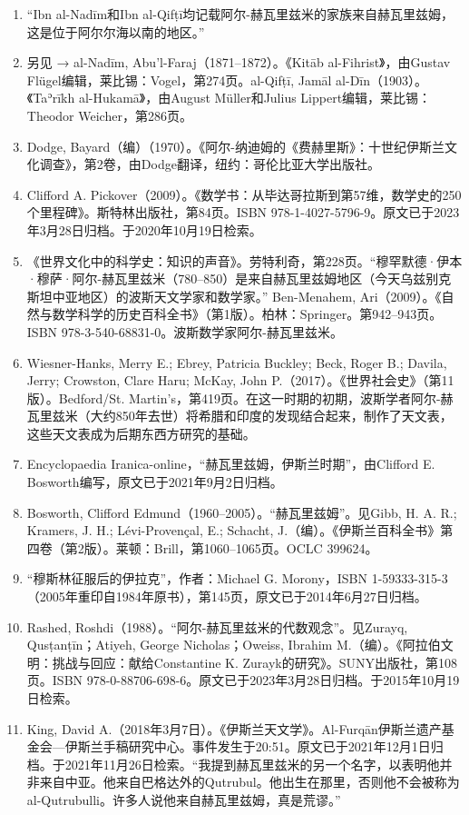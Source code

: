 \begin{enumerate}
\item “Ibn al-Nadīm和Ibn al-Qifṭī均记载阿尔-赫瓦里兹米的家族来自赫瓦里兹姆，这是位于阿尔尔海以南的地区。”  
\item 另见 → al-Nadīm, Abu'l-Faraj（1871–1872）。《Kitāb al-Fihrist》，由Gustav Flügel编辑，莱比锡：Vogel，第274页。al-Qifṭī, Jamāl al-Dīn（1903）。《Taʾrīkh al-Hukamā》，由August Müller和Julius Lippert编辑，莱比锡：Theodor Weicher，第286页。  
\item Dodge, Bayard（编）（1970）。《阿尔-纳迪姆的《费赫里斯》：十世纪伊斯兰文化调查》，第2卷，由Dodge翻译，纽约：哥伦比亚大学出版社。  
\item Clifford A. Pickover（2009）。《数学书：从毕达哥拉斯到第57维，数学史的250个里程碑》。斯特林出版社，第84页。ISBN 978-1-4027-5796-9。原文已于2023年3月28日归档。于2020年10月19日检索。  
\item 《世界文化中的科学史：知识的声音》。劳特利奇，第228页。“穆罕默德·伊本·穆萨·阿尔-赫瓦里兹米（780–850）是来自赫瓦里兹姆地区（今天乌兹别克斯坦中亚地区）的波斯天文学家和数学家。”  
Ben-Menahem, Ari（2009）。《自然与数学科学的历史百科全书》（第1版）。柏林：Springer。第942–943页。ISBN 978-3-540-68831-0。波斯数学家阿尔-赫瓦里兹米。
\item Wiesner-Hanks, Merry E.; Ebrey, Patricia Buckley; Beck, Roger B.; Davila, Jerry; Crowston, Clare Haru; McKay, John P.（2017）。《世界社会史》（第11版）。Bedford/St. Martin's，第419页。在这一时期的初期，波斯学者阿尔-赫瓦里兹米（大约850年去世）将希腊和印度的发现结合起来，制作了天文表，这些天文表成为后期东西方研究的基础。  
\item Encyclopaedia Iranica-online，“赫瓦里兹姆，伊斯兰时期”，由Clifford E. Bosworth编写，原文已于2021年9月2日归档。  
\item Bosworth, Clifford Edmund（1960–2005）。“赫瓦里兹姆”。见Gibb, H. A. R.; Kramers, J. H.; Lévi-Provençal, E.; Schacht, J.（编）。《伊斯兰百科全书》第四卷（第2版）。莱顿：Brill，第1060–1065页。OCLC 399624。  
\item “穆斯林征服后的伊拉克”，作者：Michael G. Morony，ISBN 1-59333-315-3（2005年重印自1984年原书），第145页，原文已于2014年6月27日归档。  
\item Rashed, Roshdi（1988）。“阿尔-赫瓦里兹米的代数观念”。见Zurayq, Qusṭanṭīn；Atiyeh, George Nicholas；Oweiss, Ibrahim M.（编）。《阿拉伯文明：挑战与回应：献给Constantine K. Zurayk的研究》。SUNY出版社，第108页。ISBN 978-0-88706-698-6。原文已于2023年3月28日归档。于2015年10月19日检索。  
\item King, David A.（2018年3月7日）。《伊斯兰天文学》。Al-Furqān伊斯兰遗产基金会—伊斯兰手稿研究中心。事件发生于20:51。原文已于2021年12月1日归档。于2021年11月26日检索。“我提到赫瓦里兹米的另一个名字，以表明他并非来自中亚。他来自巴格达外的Qutrubul。他出生在那里，否则他不会被称为al-Qutrubulli。许多人说他来自赫瓦里兹姆，真是荒谬。”

\end{enumerate}
